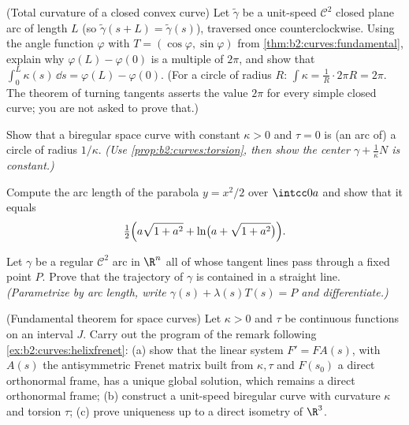 \begin{exercise}[$\star\star\star$]\label{exo:b2:curves:8}
(Total curvature of a closed convex curve) Let $\tilde\gamma$ be a
unit-speed $\mathcal{C}^2$ closed plane arc of length $L$
(so $\tilde\gamma(s + L) = \tilde\gamma(s)$), traversed once
counterclockwise. Using the angle function $\varphi$ with $T =
(\cos\varphi, \sin\varphi)$ from
\cref{thm:b2:curves:fundamental}, explain why $\varphi(L) -
\varphi(0)$ is a multiple of $2\pi$, and show that
$\int_0^L \kappa(s)\,\dd s = \varphi(L) - \varphi(0)$. (For a
circle of radius $R$: $\int \kappa = \frac1R \cdot 2\pi R = 2\pi$.
The theorem of turning tangents asserts the value $2\pi$ for
every simple closed curve; you are not asked to prove that.)
\end{exercise}

\begin{exercise}[$\star\star\star$]\label{exo:b2:curves:9}
Show that a biregular space curve with constant $\kappa > 0$ and
$\tau = 0$ is (an arc of) a circle of radius $1/\kappa$.
\emph{(Use \cref{prop:b2:curves:torsion}, then show the center
$\gamma + \frac1\kappa N$ is constant.)}
\end{exercise}

\begin{exercise}[$\star$]\label{exo:b2:curves:10}
Compute the arc length of the parabola $y = x^2/2$ over
$\intcc0a$ and show that it equals
\[
\tfrac12\Bigl(a\sqrt{1 + a^2} + \ln\bigl(a + \sqrt{1 +
a^2}\bigr)\Bigr).
\]
\end{exercise}

\begin{exercise}[$\star\star$]\label{exo:b2:curves:11}
Let $\gamma$ be a regular $\mathcal C^2$ arc in $\R^n$ all of
whose tangent lines pass through a fixed point $P$. Prove that
the trajectory of $\gamma$ is contained in a straight line.
\emph{(Parametrize by arc length, write $\gamma(s) +
\lambda(s)T(s) = P$ and differentiate.)}
\end{exercise}

\begin{exercise}[$\star\star\star$]\label{exo:b2:curves:12}
(Fundamental theorem for space curves) Let $\kappa > 0$ and
$\tau$ be continuous functions on an interval $J$. Carry out
the program of the remark following
\cref{ex:b2:curves:helixfrenet}: (a) show that the linear
system $F' = FA(s)$, with $A(s)$ the antisymmetric Frenet
matrix built from $\kappa, \tau$ and $F(s_0)$ a direct
orthonormal frame, has a unique global solution, which remains
a direct orthonormal frame; (b) construct a unit-speed
biregular curve with curvature $\kappa$ and torsion $\tau$;
(c) prove uniqueness up to a direct isometry of $\R^3$.
\end{exercise}

